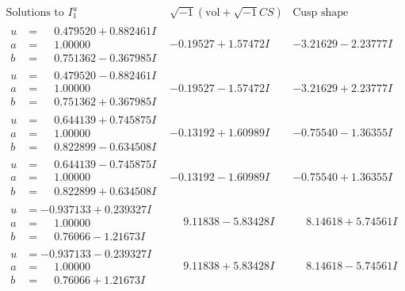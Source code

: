 \documentclass[1p]{elsarticle_modified}
\theoremstyle{definition}
\newcommand{\I}{\sqrt{-1}}
\begin{document}
$$\begin{array}{c|c|c}  
\text{Solutions to }I^u_{1}& \I (\text{vol} + \sqrt{-1}CS) & \text{Cusp shape}\\
 \hline 
\begin{aligned}
u &= \phantom{-}0.479520 + 0.882461 I \\
a &= \phantom{-}1.00000\phantom{ +0.000000I} \\
b &= \phantom{-}0.751362 - 0.367985 I\end{aligned}
 & -0.19527 + 1.57472 I & -3.21629 - 2.23777 I \\ \hline\begin{aligned}
u &= \phantom{-}0.479520 - 0.882461 I \\
a &= \phantom{-}1.00000\phantom{ +0.000000I} \\
b &= \phantom{-}0.751362 + 0.367985 I\end{aligned}
 & -0.19527 - 1.57472 I & -3.21629 + 2.23777 I \\ \hline\begin{aligned}
u &= \phantom{-}0.644139 + 0.745875 I \\
a &= \phantom{-}1.00000\phantom{ +0.000000I} \\
b &= \phantom{-}0.822899 - 0.634508 I\end{aligned}
 & -0.13192 + 1.60989 I & -0.75540 - 1.36355 I \\ \hline\begin{aligned}
u &= \phantom{-}0.644139 - 0.745875 I \\
a &= \phantom{-}1.00000\phantom{ +0.000000I} \\
b &= \phantom{-}0.822899 + 0.634508 I\end{aligned}
 & -0.13192 - 1.60989 I & -0.75540 + 1.36355 I \\ \hline\begin{aligned}
u &= -0.937133 + 0.239327 I \\
a &= \phantom{-}1.00000\phantom{ +0.000000I} \\
b &= \phantom{-}0.76066 - 1.21673 I\end{aligned}
 & \phantom{-}9.11838 - 5.83428 I & \phantom{-}8.14618 + 5.74561 I \\ \hline\begin{aligned}
u &= -0.937133 - 0.239327 I \\
a &= \phantom{-}1.00000\phantom{ +0.000000I} \\
b &= \phantom{-}0.76066 + 1.21673 I\end{aligned}
 & \phantom{-}9.11838 + 5.83428 I & \phantom{-}8.14618 - 5.74561 I \\ \hline\begin{aligned}

\end{aligned}
\end{array}$$
\end{document}
